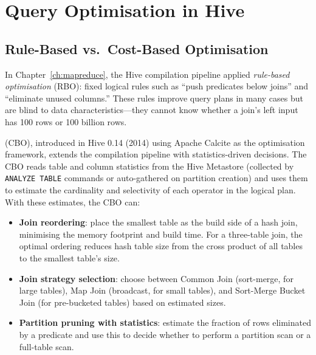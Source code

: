 \section{Query Optimisation in Hive}
\label{sec:hive-optimisation}

\subsection{Rule-Based vs.\ Cost-Based Optimisation}
\label{subsec:rbo-cbo}

In Chapter~\ref{ch:mapreduce}, the Hive compilation pipeline applied
\emph{rule-based optimisation} (RBO): fixed logical rules such as
``push predicates below joins'' and ``eliminate unused columns.'' These
rules improve query plans in many cases but are blind to data
characteristics---they cannot know whether a join's left input has
100 rows or 100 billion rows.

 (CBO), introduced in Hive 0.14 (2014)
using Apache Calcite as the optimisation framework, extends the
compilation pipeline with statistics-driven decisions. The CBO reads
table and column statistics from the Hive Metastore (collected by
\texttt{ANALYZE TABLE} commands or auto-gathered on partition creation)
and uses them to estimate the cardinality and selectivity of each
operator in the logical plan. With these estimates, the CBO can:

\begin{itemize}
  \item \textbf{Join reordering}: place the smallest table as the build
        side of a hash join, minimising the memory footprint and build
        time. For a three-table join, the optimal ordering reduces hash
        table size from the cross product of all tables to the smallest
        table's size.
  \item \textbf{Join strategy selection}: choose between Common Join
        (sort-merge, for large tables), Map Join (broadcast, for small
        tables), and Sort-Merge Bucket Join (for pre-bucketed tables)
        based on estimated sizes.
  \item \textbf{Partition pruning with statistics}: estimate the fraction
        of rows eliminated by a predicate and use this to decide whether
        to perform a partition scan or a full-table scan.
\end{itemize}

